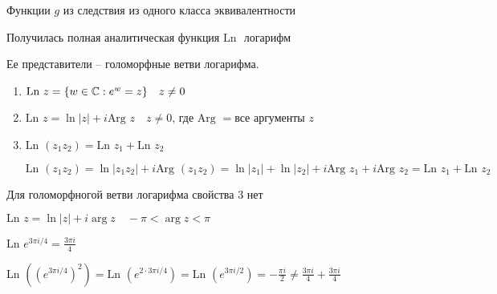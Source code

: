 \begin{definition}\thmslashn
	
	Функции $g$ из следствия из одного класса эквивалентности 
	
	Получилась полная аналитическая функция $\text{Ln }$ логарифм
	
	Ее представители -- голоморфные ветви логарифма.
 	
\end{definition}

\begin{properties}[$\text{Ln}$]
	
	\begin{enumerate}
		\item
		$\text{Ln } z = \{w\in \mathbb{C} : e^w = z\} \quad z \not = 0$
		
		\item
		$\text{Ln } z = \ln |z| + i \text{Arg } z\quad z \not = 0$, где $\text{Arg } = \text{{все аргументы }}z$
		
		\item
		$\text{Ln } (z_1 z_2) = \text{Ln } z_1 + \text{Ln } z_2$
		
		$\text{Ln } (z_1 z_2) = \ln|z_1 z_2| + i \text{Arg } (z_1 z_2) = \ln|z_1| + \ln|z_2| + i \text{Arg } z_1 + i \text{Arg } z_2 = \text{Ln } z_1 + \text{Ln } z_2$
	\end{enumerate}
	
\end{properties}

\begin{remark} Для голоморфногой ветви логарифма свойства 3 нет
	
	$\text{Ln } z = \ln|z| + i \arg z \quad -\pi < \arg z < \pi$
	
	$\text{Ln } e^{3\pi i /4} = \frac{3\pi i}{4}$
	
	$\text{Ln } \left( (e^{3\pi i /4})^2\right) = \text{Ln } \left( e^{2\cdot3\pi i /4}\right) = \text{Ln } \left( e^{3\pi i /2}\right) = -\frac{\pi i}{2} \not = \frac{3\pi i}{4} + \frac{3\pi i}{4}$
	
\end{remark}